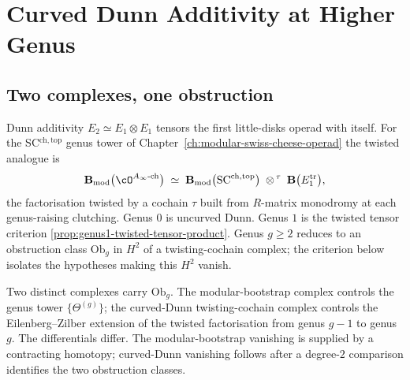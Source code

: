 
\chapter{Curved Dunn Additivity at Higher Genus}
\label{ch:curved-dunn-higher-genus}

\section*{Two complexes, one obstruction}

Dunn additivity \(E_{2} \simeq E_{1} \otimes E_{1}\) tensors the
first little-disks operad with itself. For the SC\(^{\mathrm{ch,top}}\)
genus tower of Chapter~\ref{ch:modular-swiss-cheese-operad} the
twisted analogue is
\[
 \mathbf{B}_{\mathrm{mod}}\bigl(\cO^{A_{\infty}\text{-ch}}\bigr)
 \;\simeq\;
 \mathbf{B}_{\mathrm{mod}}\bigl(\mathrm{SC}^{\mathrm{ch,top}}\bigr)
 \;\otimes^{\,\tau}\;
 \mathbf{B}\bigl(E_{1}^{\mathrm{tr}}\bigr),
\]
the factorisation twisted by a cochain \(\tau\) built from
\(R\)-matrix monodromy at each genus-raising clutching. Genus \(0\)
is uncurved Dunn. Genus \(1\) is the twisted tensor criterion
\autoref{prop:genus1-twisted-tensor-product}. Genus \(g \ge 2\)
reduces to an obstruction class \(\mathrm{Ob}_{g}\) in \(H^{2}\)
of a twisting-cochain complex; the criterion below isolates the
hypotheses making this \(H^{2}\) vanish.

Two distinct complexes carry \(\mathrm{Ob}_{g}\). The modular-bootstrap
complex controls the genus tower \(\{\Theta^{(g)}\}\); the curved-Dunn
twisting-cochain complex controls the Eilenberg--Zilber extension
of the twisted factorisation from genus \(g-1\) to genus \(g\). The
differentials differ. The modular-bootstrap vanishing is supplied
by a contracting homotopy; curved-Dunn vanishing follows after a
degree-\(2\) comparison identifies the two obstruction classes.

